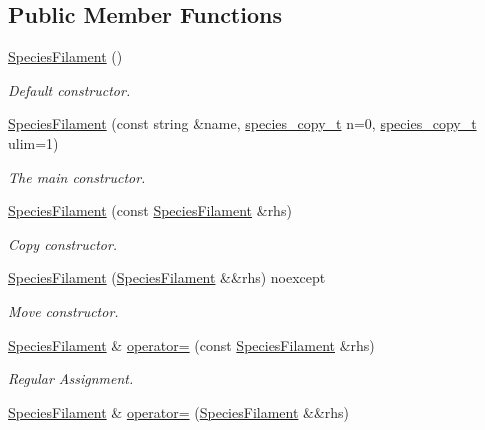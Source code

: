 \subsection*{Public Member Functions}
\begin{DoxyCompactItemize}
\item 
\hyperlink{classSpeciesFilament_a9d4dace1a3d5c2721a7544843f435ca4}{Species\+Filament} ()
\begin{DoxyCompactList}\small\item\em Default constructor. \end{DoxyCompactList}\item 
\hyperlink{classSpeciesFilament_ac912b219a8dcf080fb7d506232c6f2fd}{Species\+Filament} (const string \&name, \hyperlink{common_8h_a3503f321fd36304ee274141275cca586}{species\+\_\+copy\+\_\+t} n=0, \hyperlink{common_8h_a3503f321fd36304ee274141275cca586}{species\+\_\+copy\+\_\+t} ulim=1)
\begin{DoxyCompactList}\small\item\em The main constructor. \end{DoxyCompactList}\item 
\hyperlink{classSpeciesFilament_a33a1f5f9db874eeda35051a120d9e9d9}{Species\+Filament} (const \hyperlink{classSpeciesFilament}{Species\+Filament} \&rhs)
\begin{DoxyCompactList}\small\item\em Copy constructor. \end{DoxyCompactList}\item 
\hyperlink{classSpeciesFilament_a09461d8b9de1287a31abc041a5058ff2}{Species\+Filament} (\hyperlink{classSpeciesFilament}{Species\+Filament} \&\&rhs) noexcept
\begin{DoxyCompactList}\small\item\em Move constructor. \end{DoxyCompactList}\item 
\hyperlink{classSpeciesFilament}{Species\+Filament} \& \hyperlink{classSpeciesFilament_af6851ce7208f430d38a896905d531850}{operator=} (const \hyperlink{classSpeciesFilament}{Species\+Filament} \&rhs)
\begin{DoxyCompactList}\small\item\em Regular Assignment. \end{DoxyCompactList}\item 
\hyperlink{classSpeciesFilament}{Species\+Filament} \& \hyperlink{classSpeciesFilament_ab0d63a5f3b5bea7a19cbdd76953dc578}{operator=} (\hyperlink{classSpeciesFilament}{Species\+Filament} \&\&rhs)

\end{DoxyCompactItemize}
